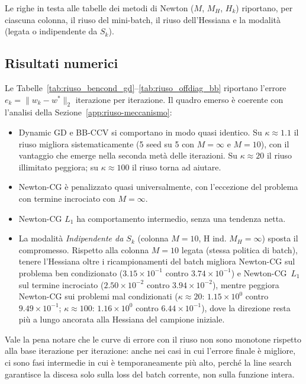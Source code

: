 Le righe in testa alle tabelle dei metodi di Newton
($M$, $M_H$, $H_k$) riportano, per ciascuna colonna, il riuso del
mini-batch, il riuso dell'Hessiana e la modalità (legata o indipendente
da $S_k$).

\subsection{Risultati numerici}\label{app:riuso-risultati}

Le Tabelle~\ref{tab:riuso_bencond_gd}--\ref{tab:riuso_offdiag_bb} riportano
l'errore $e_k = \|w_k - w^*\|_2$ iterazione per iterazione. Il quadro
emerso è coerente con l'analisi della Sezione~\ref{app:riuso-meccanismo}:

\begin{itemize}
\item Dynamic GD e BB-CCV si comportano in modo quasi identico.
  Su $\kappa \approx 1.1$ il riuso migliora sistematicamente (5 seed su 5
  con $M=\infty$ e $M=10$), con il vantaggio che emerge nella seconda metà
  delle iterazioni. Su $\kappa \approx 20$ il riuso illimitato peggiora;
  su $\kappa \approx 100$ il riuso torna ad aiutare.
\item Newton-CG è penalizzato quasi universalmente, con l'eccezione
  del problema con termine incrociato con $M=\infty$.
\item Newton-CG $L_1$ ha comportamento intermedio, senza una
  tendenza netta.
\item La modalità \emph{Indipendente da $S_k$} (colonna $M{=}10$, H ind.
  $M_H{=}\infty$) sposta il compromesso. Rispetto alla colonna $M{=}10$ legata
  (stessa politica di batch), tenere l'Hessiana oltre i ricampionamenti del
  batch migliora Newton-CG sul problema ben condizionato
  ($3.15\times10^{-1}$ contro $3.74\times10^{-1}$) e Newton-CG~$L_1$ sul
  termine incrociato ($2.50\times10^{-2}$ contro $3.94\times10^{-2}$), mentre
  peggiora Newton-CG sui problemi mal condizionati ($\kappa\approx20$:
  $1.15\times10^{0}$ contro $9.49\times10^{-1}$; $\kappa\approx100$:
  $1.16\times10^{0}$ contro $6.44\times10^{-1}$), dove la direzione resta più
  a lungo ancorata alla Hessiana del campione iniziale.
\end{itemize}

Vale la pena notare che le curve di errore con il riuso non sono monotone
rispetto alla base iterazione per iterazione: anche nei casi in cui l'errore
finale è migliore, ci sono fasi intermedie in cui è temporaneamente più alto,
perché la line search garantisce la discesa solo sulla loss del batch corrente,
non sulla funzione intera.

